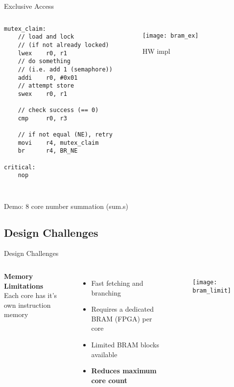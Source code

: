 \documentclass[aspectratio=169]{beamer}
\newcommand\pro{\item[$+$]}
\newcommand\con{\item[$-$]}
\begin{document}
\begin{frame}[fragile]{Exclusive Access}

\begin{columns}[t]
\begin{lstlisting}[basicstyle=\tiny\ttfamily]
mutex_claim:
    // load and lock
    // (if not already locked)
    lwex    r0, r1
    // do something
    // (i.e. add 1 (semaphore))
    addi    r0, #0x01
    // attempt store
    swex    r0, r1
    
    // check success (== 0)
    cmp     r0, r3
    
    // if not equal (NE), retry
    movi    r4, mutex_claim
    br      r4, BR_NE
    
critical:
    nop
    
\end{lstlisting}

\vspace{-1cm}
\begin{figure}
    \centering
    \texttt{[image: bram\_ex]}
    \caption{HW impl}
    \label{}
\end{figure}
\end{columns}
Demo: 8 core number summation (sum.s)
\end{frame}

\subsection{Design Challenges}
\begin{frame}[fragile,t]{Design Challenges}
\begin{columns}[t]
\textbf{Memory Limitations}\\
\vspace{0.5cm}
Each core has it's own instruction memory
\begin{itemize}
    \pro Fast fetching and branching
    \con Requires a dedicated BRAM (FPGA) per core
    \con Limited BRAM blocks available
    \con \textbf{Reduces maximum core count}
\end{itemize}
\begin{figure}
    \centering
    \texttt{[image: bram\_limit]}
\end{figure}
\end{columns}
\end{frame}
\end{document}
